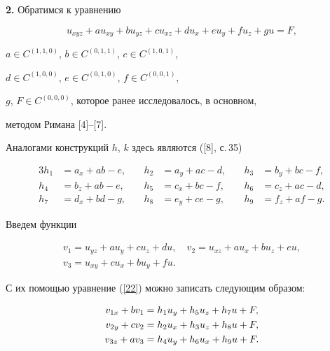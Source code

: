 {\bf 2.} Обратимся к уравнению


\begin{equation}\label{22}


u_{xyz}+au_{xy}+bu_{yz}+cu_{xz}+du_{x}+eu_{y}+fu_{z}+gu=F,


\end{equation}


$a\in C^{(1,1,0)}$, $b\in C^{(0,1,1)}$, $c\in C^{(1,0,1)}$,


$d\in C^{(1,0,0)}$, $e\in C^{(0,1,0)}$, $f\in C^{(0,0,1)}$,


$g$, $F\in C^{(0,0,0)}$, которое ранее исследовалось, в основном,


методом Римана [4]--[7].





Аналогами конструкций $h$, $k$ здесь являются ([8], с.\,35)


\begin{alignat*}{3}


h_{1}&=a_{x}+ab-e,&\quad h_{2}&=a_{y}+ac-d,&\quad h_{3}&=b_{y}+bc-f,\\


h_{4}&=b_{z}+ab-e,&\quad h_{5}&=c_{x}+bc-f,&\quad h_{6}&=c_{z}+ac-d,\\


h_{7}&=d_{x}+bd-g,&\quad h_{8}&=e_{y}+ce-g,&\quad h_{9}&=f_{z}+af-g.


\end{alignat*}


Введем функции


\begin{equation}\label{23}


\begin{array}{c}


v_{1}=u_{yz}+au_{y}+cu_{z}+du,\quad v_{2}=u_{xz}+au_{x}+bu_{z}+eu,\\[2mm]


v_{3}=u_{xy}+cu_{x}+bu_{y}+fu.


\end{array}


\end{equation}


С их помощью уравнение (\ref{22}) можно записать следующим образом:


\begin{align}


v_{1x}+bv_{1}&=h_{1}u_{y}+h_{5}u_{z}+h_{7}u+F,\notag \\


\label{24}


v_{2y}+cv_{2}&=h_{2}u_{x}+h_{3}u_{z}+h_{8}u+F,\\


v_{3z}+av_{3}&=h_{4}u_{y}+h_{6}u_{x}+h_{9}u+F.\notag


\end{align}


